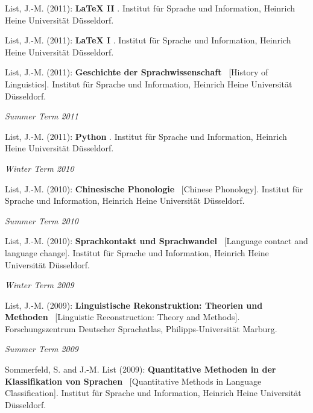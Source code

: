 \nopagebreak\noindent List, J.-M. (2011): \textbf{LaTeX II} . Institut für Sprache und Information, Heinrich Heine Universität Düsseldorf.\vspace{0.25cm}
\par
\nopagebreak\noindent List, J.-M. (2011): \textbf{LaTeX I} . Institut für Sprache und Information, Heinrich Heine Universität Düsseldorf.\vspace{0.25cm}
\par
\nopagebreak\noindent List, J.-M. (2011): \textbf{Geschichte der Sprachwissenschaft} \ [History of Linguistics]. Institut für Sprache und Information, Heinrich Heine Universität Düsseldorf.\vspace{0.25cm}
\par
\noindent\textit{Summer Term 2011}\par\nopagebreak\vspace{0.25cm}
\nopagebreak\noindent List, J.-M. (2011): \textbf{Python} . Institut für Sprache und Information, Heinrich Heine Universität Düsseldorf.\vspace{0.25cm}
\par
\noindent\textit{Winter Term 2010}\par\nopagebreak\vspace{0.25cm}
\nopagebreak\noindent List, J.-M. (2010): \textbf{Chinesische Phonologie} \ [Chinese Phonology]. Institut für Sprache und Information, Heinrich Heine Universität Düsseldorf.\vspace{0.25cm}
\par
\noindent\textit{Summer Term 2010}\par\nopagebreak\vspace{0.25cm}
\nopagebreak\noindent List, J.-M. (2010): \textbf{Sprachkontakt und Sprachwandel} \ [Language contact and language change]. Institut für Sprache und Information, Heinrich Heine Universität Düsseldorf.\vspace{0.25cm}
\par
\noindent\textit{Winter Term 2009}\par\nopagebreak\vspace{0.25cm}
\nopagebreak\noindent List, J.-M. (2009): \textbf{Linguistische Rekonstruktion: Theorien und Methoden} \ [Linguistic Reconstruction: Theory and Methods]. Forschungszentrum Deutscher Sprachatlas, Philipps-Universität Marburg.\vspace{0.25cm}
\par
\noindent\textit{Summer Term 2009}\par\nopagebreak\vspace{0.25cm}
\nopagebreak\noindent Sommerfeld, S. and J.-M. List (2009): \textbf{Quantitative Methoden in der Klassifikation von Sprachen} \ [Quantitative Methods in Language Classification]. Institut für Sprache und Information, Heinrich Heine Universität Düsseldorf.\vspace{0.25cm}
\par
